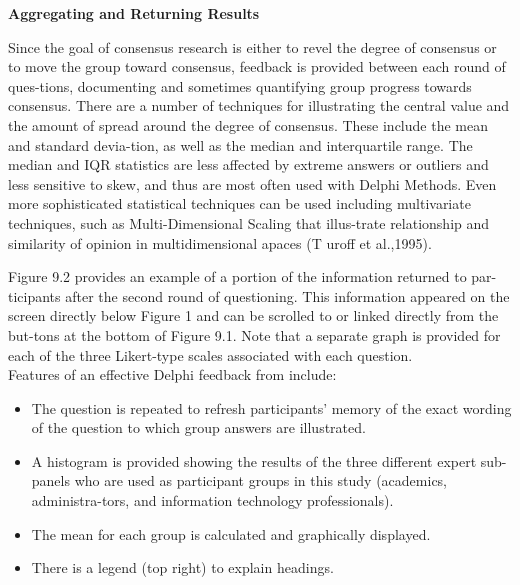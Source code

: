 \documentclass[a4,9pt]{beamer}
\begin{document}
\begin{frame}
\large{
\vspace{3mm}
\hspace{-1cm}
\textbf{Aggregating and Returning Results}\\
\vspace{3mm}
}

Since the goal of consensus research is either to revel the degree of consensus or to move the group toward consensus, feedback is provided between each round of ques-tions, documenting and sometimes quantifying group progress towards consensus. There are a number of techniques for illustrating the central value and the amount of spread around the degree of consensus. These include the mean and standard devia-tion, as well as the median and interquartile range. The median and IQR statistics are less affected by extreme answers or outliers and less sensitive to skew, and thus are most often used with Delphi Methods. Even more sophisticated statistical techniques can be used including multivariate techniques, such as Multi-Dimensional Scaling that illus-trate relationship and similarity of opinion in multidimensional apaces (T uroff et al.,1995).\\

\end{frame}

\begin{frame}
\hspace{0.5cm} Figure 9.2 provides an example of a portion of the information returned to par-ticipants after the second round of questioning. This information appeared on the screen directly below Figure 1 and can be scrolled to or linked directly from the but-tons at the bottom of Figure 9.1. Note that a separate graph is provided for each of the three Likert-type scales associated with each question.\\
\hspace{0.5cm} Features of an effective Delphi feedback from include:\\

\vspace*{0.3cm}
\begin{itemize}
  \item The question is repeated to refresh participants' memory of the exact wording of the question to which group answers are illustrated.\\
  \item A histogram is provided showing the results of the three different expert sub-panels who are used as participant groups in this study (academics, administra-tors, and information technology professionals).\\
  \item The mean for each group is calculated and graphically displayed.\\
  \item There is a legend (top right) to explain headings.\\
\end{itemize}
\end{frame}
\end{document}
